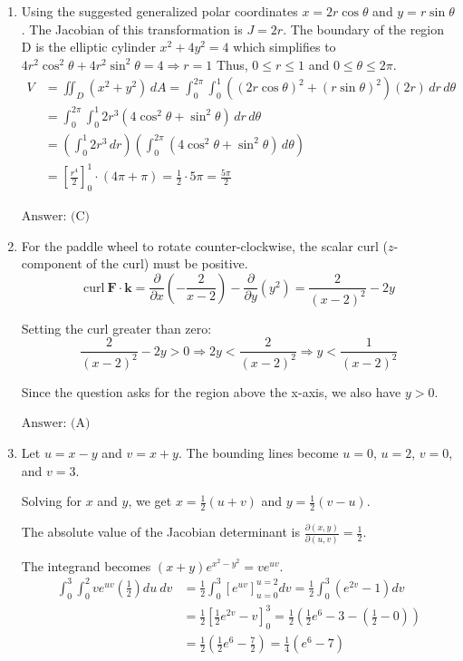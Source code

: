 \documentclass[a4paper, 12pt]{article}
\begin{document}
\begin{enumerate}[leftmargin=*,label=\textbf{\arabic*.}]
\begin{enumerate}[leftmargin=*, label=\textbf{\arabic{enumi}.\arabic*.}]
\item Using the suggested generalized polar coordinates $x=2r\cos\theta$ and $y=r\sin\theta$.
The Jacobian of this transformation is $J=2r.$
The boundary of the region D is the elliptic cylinder $x^{2}+4y^{2}=4$ which simplifies to $4r^{2}\cos^{2}\theta+4r^{2}\sin^{2}\theta=4\Rightarrow r=1$ Thus, $0\le r\le1$ and $0\le\theta\le2\pi$.
\begin{align*}
V &= \iint_{D}(x^{2}+y^{2})\,dA = \int_{0}^{2\pi}\int_{0}^{1}
     \left((2r\cos\theta)^{2}+(r\sin\theta)^{2}\right)
     (2r)\,dr\,d\theta \\
  &= \int_{0}^{2\pi}\int_{0}^{1}
     2r^{3}(4\cos^{2}\theta+\sin^{2}\theta)\,dr\,d\theta \\
  &= \left(\int_{0}^{1}2r^{3}\,dr\right)
     \left(\int_{0}^{2\pi}(4\cos^{2}\theta+\sin^{2}\theta)\,d\theta\right) \\
  &= \left[\frac{r^{4}}{2}\right]_{0}^{1}
     \cdot(4\pi+\pi)
   = \frac{1}{2}\cdot5\pi
   = \frac{5\pi}{2}
\end{align*}

$\boxed{\text{Answer: (C)}}$

\item For the paddle wheel to rotate counter-clockwise, the scalar curl ($z$-component of the curl) must be positive.
\[\text{curl}~\mathbf{F}\cdot\mathbf{k}=\frac{\partial}{\partial x}\left(-\frac{2}{x-2}\right)-\frac{\partial}{\partial y}(y^{2})=\frac{2}{(x-2)^{2}}-2y\]

Setting the curl greater than zero:
\[\frac{2}{(x-2)^{2}}-2y>0\Rightarrow2y<\frac{2}{(x-2)^{2}}\Rightarrow y<\frac{1}{(x-2)^{2}}\]

Since the question asks for the region above the x-axis, we also have $y>0$.

$\boxed{\text{Answer: (A)}}$

\item Let $u=x-y$ and $v=x+y$. The bounding lines become $u=0$, $u=2$, $v=0$, and $v=3$.

Solving for $x$ and $y$, we get $x=\frac{1}{2}(u+v)$ and $y=\frac{1}{2}(v-u)$.

The absolute value of the Jacobian determinant is $\frac{\partial(x,y)}{\partial(u,v)}=\frac{1}{2}$.

The integrand becomes $(x+y)e^{x^{2}-y^{2}}=ve^{uv}$.
\begin{align*}
\int_{0}^{3}\int_{0}^{2}ve^{uv}\left(\frac{1}{2}\right)du~dv
&=\frac{1}{2}\int_{0}^{3}[e^{uv}]_{u=0}^{u=2}dv
=\frac{1}{2}\int_{0}^{3}(e^{2v}-1)dv\\[1em]
&=\frac{1}{2}\left[\frac{1}{2}e^{2v}-v\right]_{0}^{3}
=\frac{1}{2}\left(\frac{1}{2}e^{6}-3-\left(\frac{1}{2}-0\right)\right)\\[1em]
&=\frac{1}{2}\left(\frac{1}{2}e^{6}-\frac{7}{2}\right)
=\frac{1}{4}(e^{6}-7)
\end{align*}


\end{enumerate}
\end{enumerate}
\end{document}
